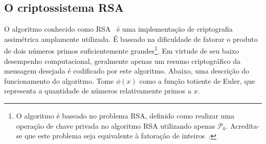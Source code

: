 \documentclass[12pt]{report}
\newcommand{\pk}{$\mathcal{P}_k$}
\begin{document}
\subsection{O criptossistema RSA}

O algoritmo conhecido como RSA~\cite{Rivest:1978:MOD:359340.359342} é uma
implementação de criptografia assimétrica amplamente utilizada. É baseado na
dificuldade de fatorar o produto de dois números primos suficientemente
grandes\footnote{O algoritmo é baseado no problema RSA, definido como realizar
uma operação de chave privada no algoritmo RSA utilizando apenas \pk{}.
Acredita-se que este problema seja equivalente à fatoração de 
inteiros~\cite[3.30]{Menezes:1996:HAC:548089}.}. Em virtude de seu baixo desempenho
computacional, geralmente apenas um resumo criptográfico da mensagem desejada é
codificado por este algoritmo. Abaixo, uma descrição do funcionamento do
algoritmo. Tome $\phi(x)$ como a função totiente de Euler, que representa a
quantidade de números relativamente primos a $x$.
\end{document}
